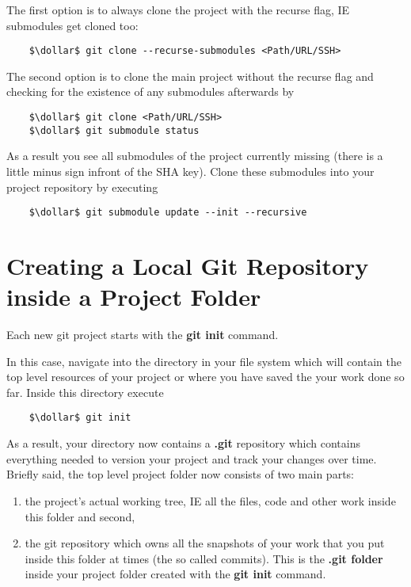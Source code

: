 
The first option is to always clone the project with the recurse flag, \ac{IE} submodules get cloned too:

\begin{lstlisting}
	$\dollar$ git clone --recurse-submodules <Path/URL/SSH>
\end{lstlisting}

The second option is to clone the main project without the recurse flag and checking for the existence of 
any submodules afterwards by 

\begin{lstlisting}
	$\dollar$ git clone <Path/URL/SSH>
	$\dollar$ git submodule status
\end{lstlisting}

As a result you see all submodules of the project currently missing (there is a little minus sign infront of the SHA key).
Clone these submodules into your project repository by executing 

\begin{lstlisting}
	$\dollar$ git submodule update --init --recursive
\end{lstlisting}






\section{Creating a Local Git Repository inside a Project Folder}
\label{chapter:1.2}

Each new git project starts with the \textbf{git init} command. 






In this case, navigate into the directory in your file system which will contain the top level resources of your project
or where you have saved the your work done so far. Inside this directory execute

\begin{lstlisting}
	$\dollar$ git init
\end{lstlisting}

As a result, your directory now contains a \textbf{.git} repository which contains everything needed to version your project and track your changes
over time. Briefly said, the top level project folder now consists of two main parts:
\begin{enumerate}
	\item the project's actual working tree, \ac{IE} all the files, code and other work inside this folder and second,
	\item the git repository which owns all the snapshots of your work that you put inside this folder at times (the so called commits). This is the \textbf{.git folder}
	inside your project folder created with the \textbf{git init} command.
\end{enumerate}

